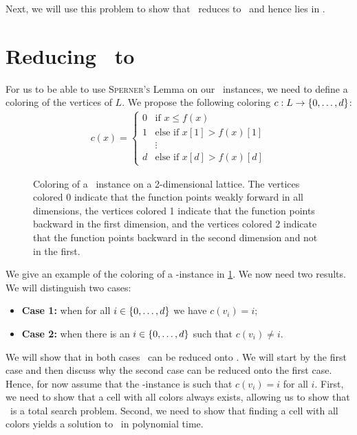 Next, we will use this problem to show that \Tarskistar\ reduces to \Sperner\ and hence lies in \PPAD\@.

\section{Reducing \Tarskistar\ to \Sperner}\label{sec:tarskistar_to_sperner}

For us to be able to use \textsc{Sperner's} Lemma on our \Tarskistar\ instances, we need to define a coloring of the vertices of $L$. We propose the following coloring $c : L \rightarrow \left\{0, \dots, d\right\}$:
\begin{align*}
	c(x) =
	\begin{cases}
		0 & \text{if $x \leq f(x)$}         \\
		1 & \text{else if $x[1] > f(x)[1]$} \\
		  & \vdots                          \\
		d & \text{else if $x[d] > f(x)[d]$}
	\end{cases}
\end{align*}

\begin{figure}[ht]
	\centering
	\caption[Coloring of a \Tarskistar-instance]{Coloring of a \Tarskistar\ instance on a 2-dimensional lattice. The vertices colored 0 indicate that the function points weakly forward in all dimensions, the vertices colored 1 indicate that the function points backward in the first dimension, and the vertices colored 2 indicate that the function points backward in the second dimension and not in the first.}\label{fig:tarskistar_coloring}
\end{figure}

We give an example of the coloring of a \Tarski-instance in \cref{fig:tarskistar_coloring}. We now need two results. We will distinguish two cases:
\begin{itemize}
	\item \textbf{Case 1:} when for all $i \in \left\{0, \dots, d\right\}$ we have $c(v_i) = i$;
	\item \textbf{Case 2:} when there is an $i \in \left\{0, \dots, d\right\}$ such that $c(v_i) \neq i$.
\end{itemize}
We will show that in both cases \Tarskistar\ can be reduced onto \Sperner. We will start by the first case and then discuss why the second case can be reduced onto the first case. Hence, for now assume that the \Tarskistar-instance is such that $c(v_i) = i$ for all $i$. First, we need to show that a cell with all colors always exists, allowing us to show that \Tarskistar\ is a total search problem. Second, we need to show that finding a cell with all colors yields a solution to \Tarskistar\ in polynomial time.

